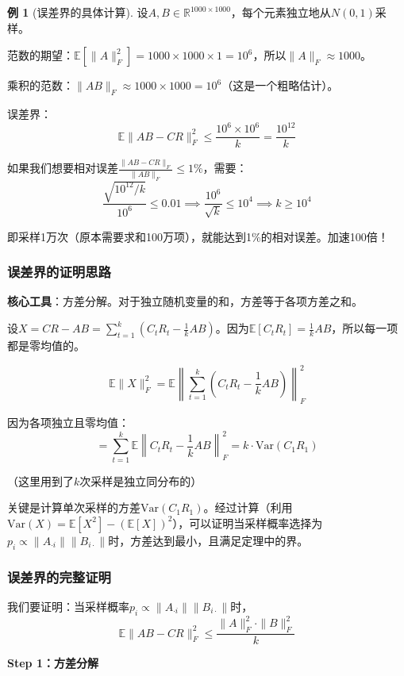 \documentclass[11pt,a4paper]{ctexart}
\theoremstyle{definition}
\newtheorem{example}[theorem]{例}
\theoremstyle{remark}
\begin{document}
\begin{example}[误差界的具体计算]
设$A, B \in \mathbb{R}^{1000 \times 1000}$，每个元素独立地从$N(0,1)$采样。

范数的期望：$\mathbb{E}[\|A\|_F^2] = 1000 \times 1000 \times 1 = 10^6$，所以$\|A\|_F \approx 1000$。

乘积的范数：$\|AB\|_F \approx 1000 \times 1000 = 10^6$（这是一个粗略估计）。

误差界：
\[
\mathbb{E}\|AB - CR\|_F^2 \leq \frac{10^6 \times 10^6}{k} = \frac{10^{12}}{k}
\]

如果我们想要相对误差$\frac{\|AB - CR\|_F}{\|AB\|_F} \leq 1\%$，需要：
\[
\frac{\sqrt{10^{12}/k}}{10^6} \leq 0.01 \implies \frac{10^6}{\sqrt{k}} \leq 10^4 \implies k \geq 10^4
\]

即采样1万次（原本需要求和100万项），就能达到1\%的相对误差。加速100倍！
\end{example}

\subsubsection{误差界的证明思路}

\textbf{核心工具}：方差分解。对于独立随机变量的和，方差等于各项方差之和。

设$X = CR - AB = \sum_{t=1}^k (C_t R_t - \frac{1}{k}AB)$。因为$\mathbb{E}[C_t R_t] = \frac{1}{k}AB$，所以每一项都是零均值的。

\[
\mathbb{E}\|X\|_F^2 = \mathbb{E}\left\|\sum_{t=1}^k \left(C_t R_t - \frac{1}{k}AB\right)\right\|_F^2
\]

因为各项独立且零均值：
\[
= \sum_{t=1}^k \mathbb{E}\left\|C_t R_t - \frac{1}{k}AB\right\|_F^2 = k \cdot \text{Var}(C_1 R_1)
\]

（这里用到了$k$次采样是独立同分布的）

关键是计算单次采样的方差$\text{Var}(C_1 R_1)$。经过计算（利用$\text{Var}(X) = \mathbb{E}[X^2] - (\mathbb{E}[X])^2$），可以证明当采样概率选择为$p_i \propto \|A_{\cdot i}\| \|B_{i\cdot}\|$时，方差达到最小，且满足定理中的界。

\subsubsection{误差界的完整证明}

我们要证明：当采样概率$p_i \propto \|A_{\cdot i}\| \|B_{i\cdot}\|$时，
\[
\mathbb{E}\|AB - CR\|_F^2 \leq \frac{\|A\|_F^2 \cdot \|B\|_F^2}{k}
\]

\textbf{Step 1：方差分解}
\end{document}
